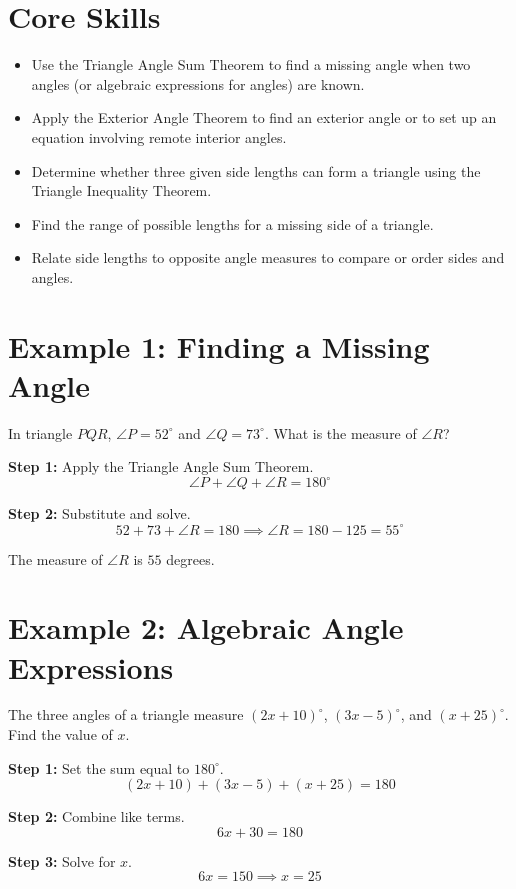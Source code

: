 \documentclass[14pt]{extarticle}
\begin{document}
\section*{Core Skills}
\begin{itemize}
  \item Use the Triangle Angle Sum Theorem to find a missing angle when two angles (or algebraic expressions for angles) are known.
  \item Apply the Exterior Angle Theorem to find an exterior angle or to set up an equation involving remote interior angles.
  \item Determine whether three given side lengths can form a triangle using the Triangle Inequality Theorem.
  \item Find the range of possible lengths for a missing side of a triangle.
  \item Relate side lengths to opposite angle measures to compare or order sides and angles.
\end{itemize}

\section*{Example 1: Finding a Missing Angle}

In triangle \(PQR\), \(\angle P = 52^\circ\) and \(\angle Q = 73^\circ\). What is the measure of \(\angle R\)?

\textbf{Step 1:} Apply the Triangle Angle Sum Theorem.
\[
\angle P + \angle Q + \angle R = 180^\circ
\]

\textbf{Step 2:} Substitute and solve.
\[
52 + 73 + \angle R = 180 \implies \angle R = 180 - 125 = 55^\circ
\]

The measure of \(\angle R\) is \(\boxed{55}\) degrees.

\section*{Example 2: Algebraic Angle Expressions}

The three angles of a triangle measure \((2x + 10)^\circ\), \((3x - 5)^\circ\), and \((x + 25)^\circ\). Find the value of \(x\).

\textbf{Step 1:} Set the sum equal to \(180^\circ\).
\[
(2x + 10) + (3x - 5) + (x + 25) = 180
\]

\textbf{Step 2:} Combine like terms.
\[
6x + 30 = 180
\]

\textbf{Step 3:} Solve for \(x\).
\[
6x = 150 \implies x = 25
\]
\end{document}

